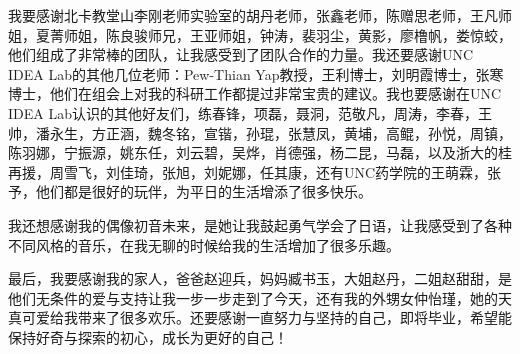 我要感谢北卡教堂山李刚老师实验室的胡丹老师，张鑫老师，陈赠思老师，王凡师姐，夏菁师姐，陈良骏师兄，王亚师姐，钟涛，裴羽尘，黄影，廖橹帆，娄惊蛟，他们组成了非常棒的团队，让我感受到了团队合作的力量。我还要感谢UNC IDEA Lab的其他几位老师：Pew-Thian Yap教授，王利博士，刘明霞博士，张寒博士，他们在组会上对我的科研工作都提过非常宝贵的建议。我也要感谢在UNC IDEA Lab认识的其他好友们，练春锋，项磊，聂洞，范敬凡，周涛，李春，王帅，潘永生，方正涵，魏冬铭，宣锴，孙琨，张慧凤，黄埔，高鲲，孙悦，周镇，陈羽娜，宁振源，姚东任，刘云碧，吴烨，肖德强，杨二昆，马磊，以及浙大的桂再援，周雪飞，刘佳琦，张旭，刘妮娜，任其康，还有UNC药学院的王萌霖，张予，他们都是很好的玩伴，为平日的生活增添了很多快乐。

我还想感谢我的偶像初音未来，是她让我鼓起勇气学会了日语，让我感受到了各种不同风格的音乐，在我无聊的时候给我的生活增加了很多乐趣。

最后，我要感谢我的家人，爸爸赵迎兵，妈妈臧书玉，大姐赵丹，二姐赵甜甜，是他们无条件的爱与支持让我一步一步走到了今天，还有我的外甥女仲怡瑾，她的天真可爱给我带来了很多欢乐。还要感谢一直努力与坚持的自己，即将毕业，希望能保持好奇与探索的初心，成长为更好的自己！

